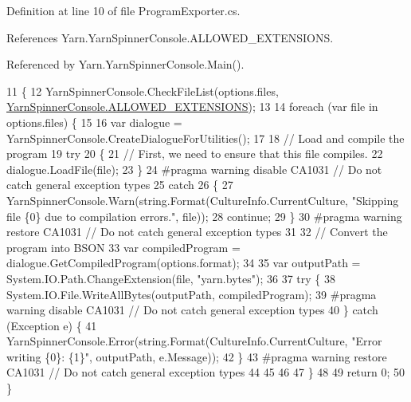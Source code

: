 Definition at line 10 of file Program\-Exporter.\-cs.



References Yarn.\-Yarn\-Spinner\-Console.\-A\-L\-L\-O\-W\-E\-D\-\_\-\-E\-X\-T\-E\-N\-S\-I\-O\-N\-S.



Referenced by Yarn.\-Yarn\-Spinner\-Console.\-Main().


\begin{DoxyCode}
11         \{
12             YarnSpinnerConsole.CheckFileList(options.files, 
      \hyperlink{a00197_a0979de7ea02c8c0375b8220a12e6575e}{YarnSpinnerConsole.ALLOWED\_EXTENSIONS});
13 
14             \textcolor{keywordflow}{foreach} (var file \textcolor{keywordflow}{in} options.files) \{
15 
16                 var dialogue = YarnSpinnerConsole.CreateDialogueForUtilities();
17 
18                 \textcolor{comment}{// Load and compile the program}
19                 \textcolor{keywordflow}{try}
20                 \{
21                     \textcolor{comment}{// First, we need to ensure that this file compiles.}
22                     dialogue.LoadFile(file);
23                 \}
24 \textcolor{preprocessor}{#pragma warning disable CA1031 // Do not catch general exception types}
25 \textcolor{preprocessor}{}                \textcolor{keywordflow}{catch}
26                 \{
27                     YarnSpinnerConsole.Warn(string.Format(CultureInfo.CurrentCulture, \textcolor{stringliteral}{"Skipping file \{0\}
       due to compilation errors."}, file));
28                     \textcolor{keywordflow}{continue};
29                 \}
30 \textcolor{preprocessor}{#pragma warning restore CA1031 // Do not catch general exception types}
31 \textcolor{preprocessor}{}
32                 \textcolor{comment}{// Convert the program into BSON}
33                 var compiledProgram = dialogue.GetCompiledProgram(options.format);
34 
35                 var outputPath = System.IO.Path.ChangeExtension(file, \textcolor{stringliteral}{"yarn.bytes"});
36 
37                 \textcolor{keywordflow}{try} \{
38                     System.IO.File.WriteAllBytes(outputPath, compiledProgram);
39 \textcolor{preprocessor}{#pragma warning disable CA1031 // Do not catch general exception types}
40 \textcolor{preprocessor}{}                \} \textcolor{keywordflow}{catch} (Exception e) \{
41                     YarnSpinnerConsole.Error(string.Format(CultureInfo.CurrentCulture, \textcolor{stringliteral}{"Error writing \{0\}:
       \{1\}"}, outputPath, e.Message));
42                 \}
43 \textcolor{preprocessor}{#pragma warning restore CA1031 // Do not catch general exception types}
44 \textcolor{preprocessor}{}
45 
46 
47             \}
48 
49             \textcolor{keywordflow}{return} 0;
50         \}
\end{DoxyCode}


